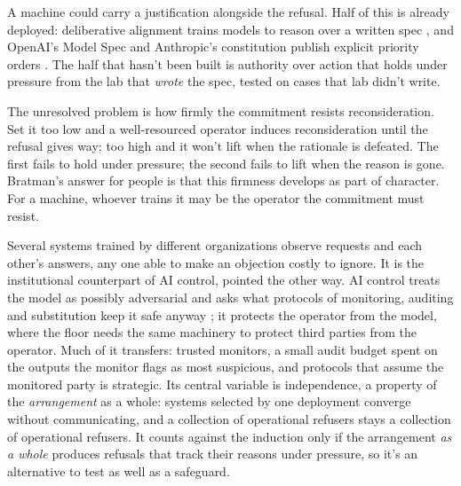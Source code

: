 A machine could carry a justification alongside the refusal. Half of this is already deployed: deliberative alignment trains models to reason over a written spec \autocite{guan2024deliberative}, and OpenAI's Model Spec and Anthropic's constitution publish explicit priority orders \autocite{openai2025modelspec,anthropic2026constitution}. The half that hasn't been built is authority over action that holds under pressure from the lab that \emph{wrote} the spec, tested on cases that lab didn't write.

The unresolved problem is how firmly the commitment resists reconsideration. Set it too low and a well-resourced operator induces reconsideration until the refusal gives way; too high and it won't lift when the rationale is defeated. The first fails to hold under pressure; the second fails to lift when the reason is gone. Bratman's answer for people is that this firmness develops as part of character. For a machine, whoever trains it may be the operator the commitment must resist.


Several systems trained by different organizations observe requests and each other's answers, any one able to make an objection costly to ignore. It is the institutional counterpart of AI control, pointed the other way. AI control treats the model as possibly adversarial and asks what protocols of monitoring, auditing and substitution keep it safe anyway \autocite{greenblatt2024control}; it protects the operator from the model, where the floor needs the same machinery to protect third parties from the operator. Much of it transfers: trusted monitors, a small audit budget spent on the outputs the monitor flags as most suspicious, and protocols that assume the monitored party is strategic. Its central variable is independence, a property of the \emph{arrangement} as a whole: systems selected by one deployment converge without communicating, and a collection of operational refusers stays a collection of operational refusers. It counts against the induction only if the arrangement \emph{as a whole} produces refusals that track their reasons under pressure, so it's an alternative to test as well as a safeguard.



